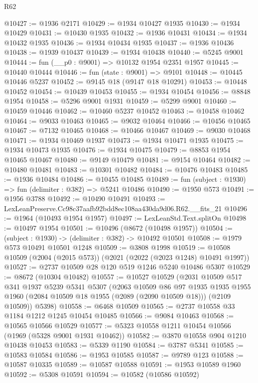\begin{lexlean}{R62}
\begin{coremodule}
@10427 := @1936 @2171
@10429 := @1934 @10427 @1935
@10430 := @1934 @10429
@10431 := @10430 @1935
@10432 := @1936 @10431
@10434 := @1934 @10432 @1935
@10436 := @1934 @10434 @1935
@10437 := @1936 @10436
@10438 := @1939 @10437
@10439 := @1934 @10438
@10440 := @5245 @9001
@10444 := fun (__p0 : @9001) => @10132 @1954 @2351 @1957
@10445 := @10440 @10444
@10446 := fun (state : @9001) => @9101
@10448 := @10445 @10446 @5237
@10452 := @9145 @18 (@9147 @18 @10291)
@10453 := @10448 @10452
@10454 := @10439 @10453
@10455 := @1934 @10454
@10456 := @8848 @1954
@10458 := @5296 @9001 @1931
@10459 := @5299 @9001
@10460 := @10459 @10446
@10462 := @10460 @5237 @10452
@10463 := @10458 @10462
@10464 := @9033 @10463
@10465 := @9032 @10464
@10466 := @10456 @10465
@10467 := @7132 @10465
@10468 := @10466 @10467
@10469 := @9030 @10468
@10471 := @1934 @10469 @1937
@10473 := @1934 @10471 @1935
@10475 := @1934 @10473 @1935
@10476 := @1934 @10475
@10479 := @8853 @1954 @10465 @10467
@10480 := @9149 @10479
@10481 := @9154 @10464
@10482 := @10480 @10481
@10483 := @10301 @10482
@10484 := @10476 @10483
@10485 := @1936 @10484
@10486 := @10455 @10485
@10489 := fun (subject : @1930) => fun (delimiter : @382) => @5241 @10486
@10490 := @1950 @573
@10491 := @1956 @3788
@10492 := @10490 @10491
@10493 := LexLeanPreserve.Cc98c37aafb92bdd8ec108aa430da9d06.R62.__fits_21
@10496 := @1964 (@10493 @1954 @1957)
@10497 := LexLeanStd.Text.splitOn
@10498 := @10497 @1954
@10501 := @10496 (@8672 (@10498 @1957))
@10504 := (subject : @1930) -> (delimiter : @382) -> @10492 @10501
@10508 := @1979 @573 @10491 @10501 @1248
@10509 := @3808 @1998
@10519 := @10508 @10509 (@2004 (@2015 @573)) (@2021 (@2022 (@2023 @1248) @10491 @1997))
@10527 := @2737 @10509 @28 @120 @519 @1246 @5240 @10486 @5307
@10529 := @8672 (@10304 @10482)
@10557 := @10527
    @10529
    (@2031
      @10509
      @517
      @341
      @1937
      @5239
      @5341
      @5307
      (@2063
        @10509
        @86
        @97
        @1935
        @1935
        @1955
        @1960
        (@2084 @10509 @18 @1955 (@2089 (@2090 @10509 @18)))
        (@2109 @10509))
      @5398)
@10558 := @6468 @10509
@10565 := @2737 @10558 @33 @1184 @1212 @1245 @10454 @10485
@10566 := @9084 @10463
@10568 := @10565 @10566 @10529
@10577 := @5323 @10558 @1211 @10454 @10566 (@1969 (@5328 @9001 @1931 @10462))
@10582 := @3870 @10558 @904 @1210 @10438 @10453
@10583 := @5339 @1190
@10584 := @3787 @5341
@10585 := @10583 @10584
@10586 := @1953 @10585
@10587 := @9789 @123
@10588 := @10587 @10335
@10589 := @10587 @10588
@10591 := @1953 @10589 @1960
@10592 := @5308 @10591
@10594 := @10582 (@10586 @10592)

\end{coremodule}
\end{lexlean}
